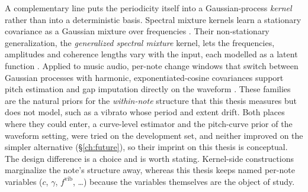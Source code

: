 A complementary line puts the periodicity itself into a Gaussian-process
\emph{kernel} rather than into a deterministic basis. Spectral mixture
kernels learn a stationary covariance as a Gaussian mixture over
frequencies \cite{wilson2013}. Their non-stationary generalization, the
\emph{generalized spectral mixture} kernel, lets the frequencies, amplitudes
and coherence lengths vary with the input, each modelled as a latent
function \cite{remes2017}. Applied to music audio, per-note change windows
that switch between Gaussian processes with harmonic, exponentiated-cosine
covariances support pitch estimation and gap imputation directly on the
waveform \cite{alvarado2016}. These families are the natural priors for the
\emph{within-note} structure that this thesis measures but does not model,
such as a vibrato whose period and extent drift. Both places where they
could enter, a curve-level estimator and the pitch-curve prior of the
waveform setting, were tried on the development set, and neither improved
on the simpler alternative (\S\ref{ch:future}), so their imprint on this
thesis is conceptual. The design difference is a choice and is worth
stating. Kernel-side constructions marginalize the note's structure away,
whereas this thesis keeps named per-note variables ($c$, $\gamma$,
$f^{\mathrm{vib}}$, \dots) because the variables themselves are the object
of study.

